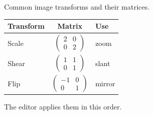 \documentclass{article}
\begin{document}
Common image transforms and their matrices.

\begin{tabular}{lcl}
\toprule
Transform & Matrix & Use \\
\midrule
Scale & $\begin{pmatrix} 2 & 0 \\ 0 & 2 \end{pmatrix}$ & zoom \\

Shear & $\begin{pmatrix} 1 & 1 \\ 0 & 1 \end{pmatrix}$ & slant \\

Flip & $\begin{pmatrix} -1 & 0 \\ 0 & 1 \end{pmatrix}$ & mirror \\
\bottomrule
\end{tabular}

The editor applies them in this order.
\end{document}
